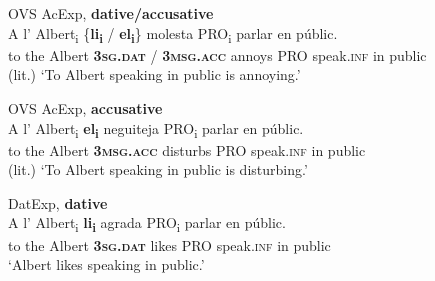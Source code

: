 \documentclass[output=paper,colorlinks,citecolor=brown,modfonts,nonflat]{langsci/langscibook}
\begin{document}



\glt

  \z
  \z


\ea%
 \label{ex:royo:12}
 \ea OVS AcExp, \textbf{dative/accusative} \label{ex:royo:12a}\\
 \gll  A l’ Albert\textsubscript{i} \{\textbf{li\textsubscript{i}} / \textbf{el\textsubscript{i}}\} molesta PRO\textsubscript{i} parlar en públic.\\
 to the Albert \textbf{\textsc{3sg.dat}} / \textbf{\textsc{3msg.acc}} annoys PRO speak.\textsc{inf} in public\\
 \glt (lit.) ‘To Albert speaking in public is annoying.’

 \ex OVS AcExp, \textbf{accusative}\label{ex:royo:12b}\\
 \gll A l’ Albert\textsubscript{i} \textbf{el\textsubscript{i}} neguiteja PRO\textsubscript{i} parlar en públic.\\
  to the Albert \textbf{\textsc{3msg.acc}} disturbs PRO speak.\textsc{inf} in public\\
\glt (lit.) ‘To Albert speaking in public is disturbing.’

 \ex DatExp, \textbf{dative}\label{ex:royo:12c}\\
 \gll A l’ Albert\textsubscript{i} \textbf{li\textsubscript{i}} agrada PRO\textsubscript{i} parlar en públic.\\
 to the Albert \textbf{\textsc{3sg.dat}} likes PRO speak.\textsc{inf} in public\\
\glt ‘Albert likes speaking in public.’
\end{document}
